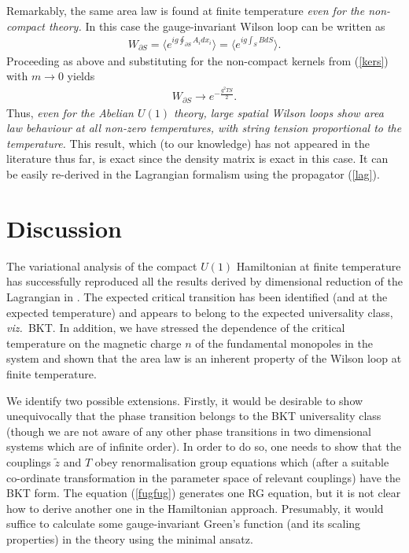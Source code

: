 \documentclass[a4paper,a4paper]{article}
\begin{document}
Remarkably, the same area law is found at finite temperature \emph{even for the non-compact theory.}
In this case the gauge-invariant Wilson loop can be written as
\begin{gather}
W_{\partial S} = \langle e^{i g \oint_{\partial S} A_i d x_i } \rangle = 
\langle  e^{ig \int_{S} B d S} \rangle.
\end{gather}
Proceeding as above and substituting for the non-compact kernels from (\ref{kers}) with $ m \rightarrow 0$ yields
\begin{gather}
W_{\partial S} \rightarrow e^{-\frac{g^2 T S}{2}}.
\end{gather}
Thus, \emph{even for the Abelian $U(1)$ theory, large spatial Wilson loops show area law behaviour at all non-zero temperatures, 
with string tension proportional to the temperature.} This result, which (to our knowledge) has
not appeared in the literature thus far, is exact since the density matrix is exact in this case.
It can be easily re-derived in the Lagrangian formalism using the propagator (\ref{lag}).
%





%
\section{Discussion}
The variational analysis of the compact $U(1)$ Hamiltonian at finite temperature has successfully reproduced
all the results derived by dimensional reduction of the Lagrangian in \cite{Agasian:1998wv}. The expected critical transition has
been identified (and at the expected temperature) and appears to belong to the expected universality class, \emph{viz.\ }BKT.
In addition, we have stressed the dependence of the critical temperature on the magnetic charge $n$ of the fundamental monopoles
in the system and shown that the area law is an inherent property of the Wilson loop at finite temperature.

We identify two possible extensions. Firstly, it would be desirable to show unequivocally that the phase transition belongs to the BKT
universality class (though we are not aware of any other phase transitions in two dimensional systems which are of infinite order).
In order to do so, one needs to show that the couplings $\tilde{z}$ and $T$ obey renormalisation group equations which 
(after a suitable co-ordinate transformation in the parameter space of relevant couplings) have the BKT form. The equation (\ref{fugfug})
generates one RG equation, but it is not clear how to derive another one in the Hamiltonian approach. Presumably, it would
suffice to calculate some gauge-invariant Green's function (and its scaling properties) in the theory using the minimal ansatz. 
\end{document}
